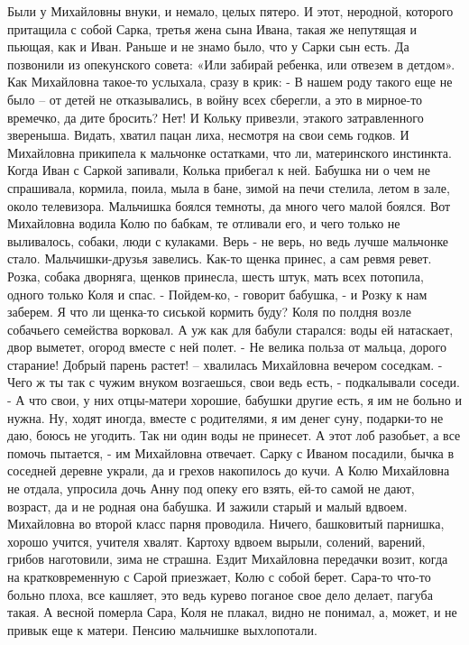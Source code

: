 Были у Михайловны внуки, и немало, целых пятеро. И этот, неродной, которого притащила с собой Сарка, третья жена сына Ивана, такая же непутящая и пьющая, как и Иван. Раньше и не знамо было, что у Сарки сын есть. Да позвонили из опекунского совета: «Или забирай ребенка, или отвезем в детдом». Как Михайловна такое-то услыхала, сразу в крик:
- В нашем роду такого еще не было – от детей не отказывались, в войну всех сберегли, а это в мирное-то времечко, да дите бросить? Нет!
И Кольку привезли, этакого затравленного звереныша. Видать, хватил пацан лиха, несмотря на свои семь годков. И Михайловна прикипела к мальчонке остатками, что ли, материнского инстинкта. Когда Иван с Саркой запивали, Колька прибегал к ней. Бабушка ни о чем не спрашивала, кормила, поила, мыла в бане, зимой на печи стелила, летом в зале, около телевизора. Мальчишка боялся темноты, да много чего малой боялся. Вот Михайловна водила Колю по бабкам, те отливали его, и чего только не выливалось, собаки, люди с кулаками. Верь - не верь, но ведь лучше мальчонке стало. Мальчишки-друзья завелись. Как-то щенка принес, а сам ревмя ревет. Розка, собака дворняга, щенков принесла, шесть штук, мать всех потопила, одного только Коля и спас.
- Пойдем-ко, - говорит бабушка, - и Розку к нам заберем. Я что ли щенка-то сиськой кормить буду?
Коля по полдня возле собачьего семейства ворковал. А уж как для бабули старался: воды ей натаскает, двор выметет, огород вместе с ней полет.
- Не велика польза от мальца, дорого старание! Добрый парень растет! – хвалилась Михайловна вечером соседкам.
- Чего ж ты так с чужим внуком возгаешься, свои ведь есть, - подкалывали соседи.
- А что свои, у них отцы-матери хорошие, бабушки другие есть, я им не больно и нужна. Ну, ходят иногда, вместе с родителями, я им денег суну, подарки-то не даю, боюсь не угодить. Так ни один воды не принесет. А этот лоб разобьет, а все помочь пытается, - им Михайловна отвечает.
Сарку с Иваном посадили, бычка в соседней деревне украли, да и грехов накопилось до кучи. А Колю Михайловна не отдала, упросила дочь Анну под опеку его взять, ей-то самой не дают, возраст, да и не родная она бабушка. И зажили старый и малый вдвоем. Михайловна во второй класс парня проводила. Ничего, башковитый парнишка, хорошо учится, учителя хвалят. Картоху вдвоем вырыли, солений, варений, грибов наготовили, зима не страшна. Ездит Михайловна передачки возит, когда на кратковременную с Сарой приезжает, Колю с собой берет. Сара-то что-то больно плоха, все кашляет, это ведь курево поганое свое дело делает, пагуба такая. А весной померла Сара, Коля не плакал, видно не понимал, а, может, и не привык еще к матери. Пенсию мальчишке выхлопотали.
